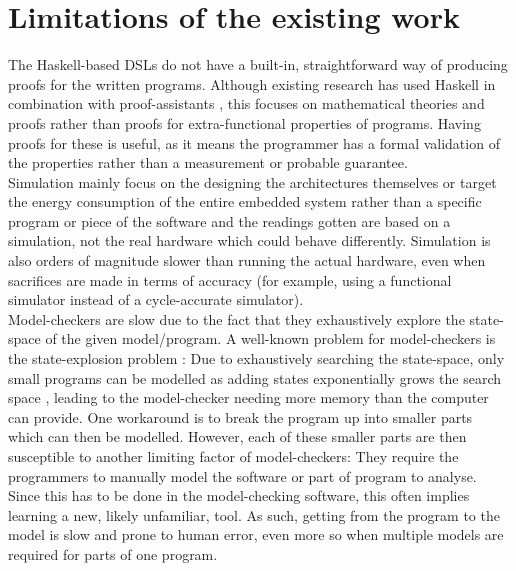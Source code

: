 \section{Limitations of the existing work}
	The Haskell-based DSLs do not have a built-in, straightforward way of producing proofs for the written programs. Although existing research has used Haskell in combination with proof-assistants \cite{10.1007/978-3-319-08434-3_9}, this focuses on mathematical theories and proofs rather than proofs for extra-functional properties of programs. Having proofs for these is useful, as it means the programmer has a formal validation of the properties rather than a measurement or probable guarantee.
    \\
    
    Simulation mainly focus on the designing the architectures themselves \cite{10.1007/3-540-46002-0_32,Lee:2008:FFC:1375657.1375670} or target the energy consumption of the entire embedded system \cite{782199} rather than a specific program or piece of the software and the readings gotten are based on a simulation, not the real hardware which could behave differently. Simulation is also orders of magnitude slower than running the actual hardware, even when sacrifices are made in terms of accuracy (for example, using a functional simulator instead of a cycle-accurate simulator).
    \\
    
    Model-checkers are slow due to the fact that they exhaustively explore the state-space of the given model/program. A well-known problem for model-checkers is the state-explosion problem \cite{Clarke2001,Clarke2012,Valmari1998}: Due to exhaustively searching the state-space, only small programs can be modelled as adding states exponentially grows the search space \cite{Clarke2001,Clarke2012}, leading to the model-checker needing more memory than the computer can provide. One workaround is to break the program up into smaller parts which can then be modelled. However, each of these smaller parts are then susceptible to another limiting factor of model-checkers: They require the programmers to manually model the software or part of program to analyse. Since this has to be done in the model-checking software, this often implies learning a new, likely unfamiliar, tool. As such, getting from the program to the model is slow and prone to human error, even more so when multiple models are required for parts of one program.
	
    
